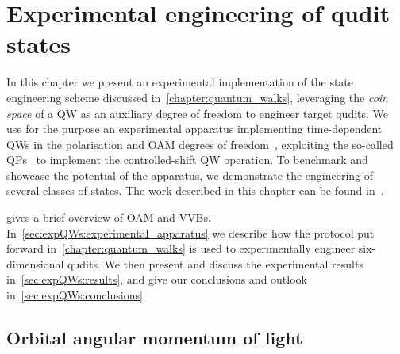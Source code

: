 
\chapter{Experimental engineering of qudit states}
\label{chapter:experimental_engineering_qudits}

 In this chapter we present an experimental implementation of the state engineering scheme discussed in~\cref{chapter:quantum_walks}, leveraging the \emph{coin space} of a \ac{QW} as an auxiliary degree of freedom to engineer target qudits.
We use for the purpose an experimental apparatus implementing time-dependent \acp{QW} in the polarisation and \ac{OAM} degrees of freedom~\cite{zhang2010implementation,goyal2013implementing,cardano2015quantum}, exploiting the so-called \acp{QP}~\cite{marrucci2006optical} to implement the controlled-shift QW operation.
To benchmark and showcase the potential of the apparatus, we demonstrate the engineering of several classes of states.
The work described in this chapter can be found in~\cite{giordani2019experimental}.

 gives a brief overview of \ac{OAM} and \acp{VVB}.
In~\cref{sec:expQWs:experimental_apparatus} we describe how the protocol put forward in~\cref{chapter:quantum_walks} is used to experimentally engineer six-dimensional qudits.
We then present and discuss the experimental results in~\cref{sec:expQWs:results}, and give our conclusions and outlook in~\cref{sec:expQWs:conclusions}.


\section{Orbital angular momentum of light}
\label{sec:expQWs:OAMintro}

